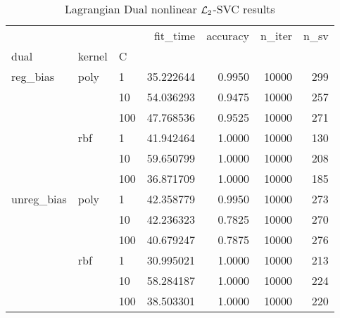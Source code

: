 \begin{table}[H]
\centering
\caption{Lagrangian Dual nonlinear $\protect \mathcal{L}_2$-SVC results}
\label{nonlinear_lagrangian_dual_l2_svc_cv_results}
\begin{tabular}{lllrrrr}
\toprule
           &     &     &   fit\_time &  accuracy &  n\_iter &  n\_sv \\
dual & kernel & C &            &           &         &       \\
\midrule
reg\_bias & poly & 1   &  35.222644 &    0.9950 &   10000 &   299 \\
           &     & 10  &  54.036293 &    0.9475 &   10000 &   257 \\
           &     & 100 &  47.768536 &    0.9525 &   10000 &   271 \\
           & rbf & 1   &  41.942464 &    1.0000 &   10000 &   130 \\
           &     & 10  &  59.650799 &    1.0000 &   10000 &   208 \\
           &     & 100 &  36.871709 &    1.0000 &   10000 &   185 \\
unreg\_bias & poly & 1   &  42.358779 &    0.9950 &   10000 &   273 \\
           &     & 10  &  42.236323 &    0.7825 &   10000 &   270 \\
           &     & 100 &  40.679247 &    0.7875 &   10000 &   276 \\
           & rbf & 1   &  30.995021 &    1.0000 &   10000 &   213 \\
           &     & 10  &  58.284187 &    1.0000 &   10000 &   224 \\
           &     & 100 &  38.503301 &    1.0000 &   10000 &   220 \\
\bottomrule
\end{tabular}
\end{table}
